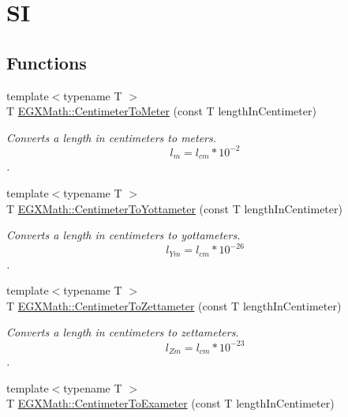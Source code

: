 \hypertarget{group___e_g_x_math-_conversions-_length_conversions-_s_i-_centimeter-_s_i}{}\section{SI}
\label{group___e_g_x_math-_conversions-_length_conversions-_s_i-_centimeter-_s_i}
\subsection*{Functions}
\begin{DoxyCompactItemize}
\item 
{\footnotesize template$<$typename T $>$ }\\T \mbox{\hyperlink{group___e_g_x_math-_conversions-_length_conversions-_s_i-_centimeter-_s_i_gaebbc38cdc9fa18257e8cf4a0bbbb117a}{E\+G\+X\+Math\+::\+Centimeter\+To\+Meter}} (const T length\+In\+Centimeter)
\begin{DoxyCompactList}\small\item\em Converts a length in centimeters to meters. \[ l_{m}=l_{cm} * 10^{-2} \]. \end{DoxyCompactList}\item 
{\footnotesize template$<$typename T $>$ }\\T \mbox{\hyperlink{group___e_g_x_math-_conversions-_length_conversions-_s_i-_centimeter-_s_i_gace13ddc9d41561595a03d858577763c3}{E\+G\+X\+Math\+::\+Centimeter\+To\+Yottameter}} (const T length\+In\+Centimeter)
\begin{DoxyCompactList}\small\item\em Converts a length in centimeters to yottameters. \[ l_{Ym}=l_{cm} * 10^{-26} \]. \end{DoxyCompactList}\item 
{\footnotesize template$<$typename T $>$ }\\T \mbox{\hyperlink{group___e_g_x_math-_conversions-_length_conversions-_s_i-_centimeter-_s_i_ga20ad80d764e7cc6f34245fe2ab4e7772}{E\+G\+X\+Math\+::\+Centimeter\+To\+Zettameter}} (const T length\+In\+Centimeter)
\begin{DoxyCompactList}\small\item\em Converts a length in centimeters to zettameters. \[ l_{Zm}=l_{cm} * 10^{-23} \]. \end{DoxyCompactList}\item 
{\footnotesize template$<$typename T $>$ }\\T \mbox{\hyperlink{group___e_g_x_math-_conversions-_length_conversions-_s_i-_centimeter-_s_i_ga8b69e702b6a245a68f57d52474f21c1a}{E\+G\+X\+Math\+::\+Centimeter\+To\+Exameter}} (const T length\+In\+Centimeter)

\end{DoxyCompactItemize}
